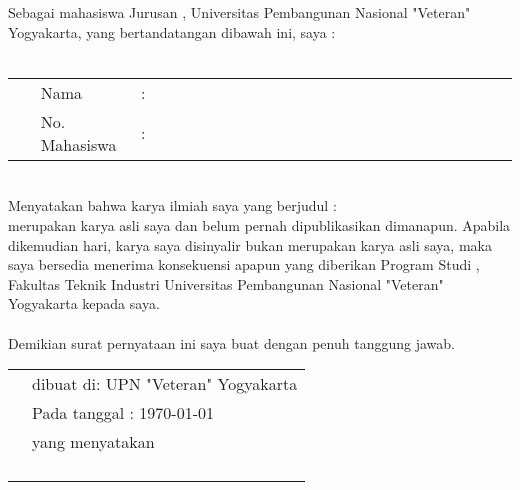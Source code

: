 \makeatletter
\let\kaprodi\@kaprodi
\let\kajur\@kajur
\let\pembimbingA\@firstsupervisor
\let\pembimbingB\@secondsupervisor
\let\jurusan\@dept
\let\Prodi\@program
\let\fullname\@fullname
\let\idnum\@idnum
\let\titleind\@titleind
\let\titleindsurat\@titleindsurat
\let\faculty\@faculty
\makeatother
{}


Sebagai mahasiswa Jurusan \jurusan\; \faculty, Universitas Pembangunan Nasional "Veteran" Yogyakarta, yang bertandatangan dibawah ini, saya :\\\\
\begin{tabular}{p{0.05\linewidth} p{0.2\linewidth}p{0.0025\linewidth} p{0.77\linewidth}}
	&Nama & : & \fullname\\
	&No. Mahasiswa &:&\idnum\\
\end{tabular}
\\

Menyatakan bahwa karya ilmiah saya yang berjudul :\\
\textbf{\titleindsurat} merupakan karya asli saya dan belum pernah dipublikasikan dimanapun. Apabila dikemudian hari, karya saya disinyalir bukan merupakan karya asli saya, maka saya bersedia menerima konsekuensi apapun yang diberikan Program Studi \Prodi, Fakultas Teknik Industri Universitas Pembangunan Nasional "Veteran" Yogyakarta kepada saya.\\
\\
Demikian surat pernyataan ini saya buat dengan penuh tanggung jawab.
\vspace{0.5cm}


\begin{tabular}{p{5.7cm}l}
&dibuat di: UPN "Veteran" Yogyakarta\\
&Pada tanggal : \today\\
&yang menyatakan\\
&	\\
&	\\
&	\\
&	\multicolumn{1}{c}{\textbf{\fullname}}
\end{tabular}
